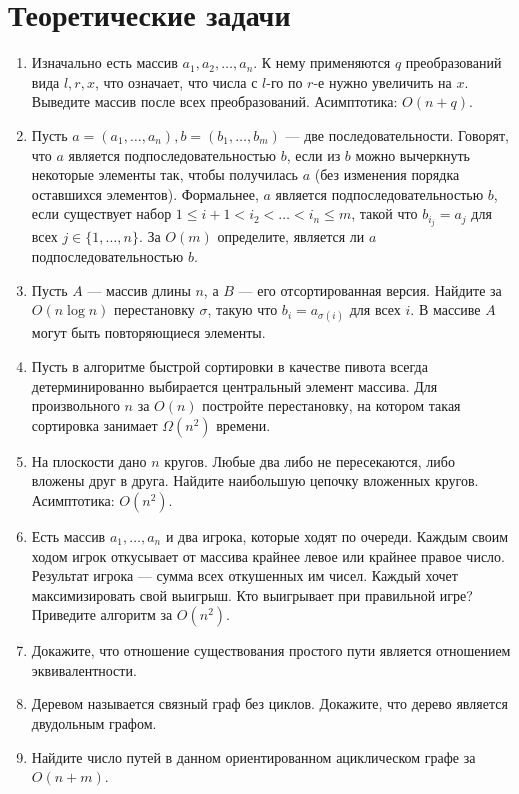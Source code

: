 \documentclass[a4paper, 12pt]{article}
\begin{document}
  \section*{Теоретические задачи}
  \begin{enumerate}
    \item Изначально есть массив $a_1 , a_2 , \dots , a_n$. К нему применяются $q$ преобразований вида $l, r, x$, что означает, что числа с $l$-го по $r$-е нужно увеличить на $x$. Выведите массив после всех преобразований. Асимптотика: $O(n + q)$.
    \item Пусть $a = (a_1, \dots , a_n ), b = (b_1 , \dots, b_m )$ --- две последовательности. Говорят, что $a$ является подпоследовательностью $b$, если из $b$ можно вычеркнуть некоторые элементы так, чтобы получилась $a$ (без изменения порядка оставшихся элементов). Формальнее, $a$ является подпоследовательностью $b$, если существует набор $1 \le i+1 < i_2 < \dots < i_n \le m$, такой что $b_{i_j} = a_j$ для всех $j \in \{1, \dots, n\}$. За $O(m)$ определите, является ли $a$ подпоследовательностью $b$. 
    \item Пусть $A$ --- массив длины $n$, а $B$ --- его отсортированная версия. Найдите за $O(n\log n)$ перестановку $\sigma$, такую что $b_i = a_{\sigma(i)}$ для всех $i$. В массиве $A$ могут быть повторяющиеся элементы.
    \item Пусть в алгоритме быстрой сортировки в качестве пивота всегда детерминированно выбирается центральный элемент массива. Для произвольного $n$ за $O(n)$ постройте перестановку, на котором такая сортировка занимает $\Omega(n^2)$ времени.
    \item На плоскости дано $n$ кругов. Любые два либо не пересекаются, либо вложены друг в друга. Найдите наибольшую цепочку вложенных кругов. Асимптотика: $O(n^2)$.
    \item Есть массив $a_1, \dots, a_n$ и два игрока, которые ходят по очереди. Каждым своим ходом игрок откусывает от массива крайнее левое или крайнее правое число. Результат игрока --- сумма всех откушенных им чисел. Каждый хочет максимизировать свой выигрыш. Кто выигрывает при правильной игре? Приведите алгоритм за $O(n^2)$.
    \item Докажите, что отношение существования простого пути является отношением эквивалентности.
    \item Деревом называется связный граф без циклов. Докажите, что дерево является двудольным графом.
    \item Найдите число путей в данном ориентированном ациклическом графе за $O(n + m)$.
  \end{enumerate}
\end{document}
